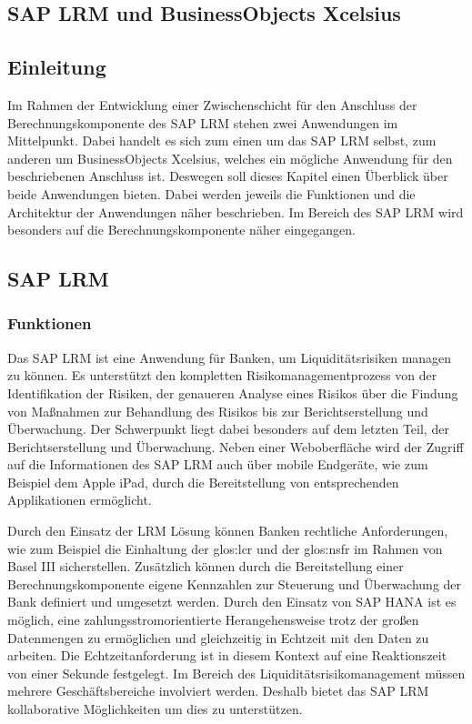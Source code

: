 \begin{onehalfspacing}
\chapter{SAP LRM und BusinessObjects Xcelsius} 

\section{Einleitung}
Im Rahmen der Entwicklung einer Zwischenschicht für den Anschluss der Berechnungskomponente des SAP LRM stehen zwei Anwendungen im Mittelpunkt. Dabei handelt es sich zum einen um das SAP LRM selbst, zum anderen um BusinessObjects Xcelsius, welches ein mögliche Anwendung für den beschriebenen Anschluss ist. Deswegen soll dieses Kapitel einen Überblick über beide Anwendungen bieten. Dabei werden jeweils die Funktionen und die Architektur der Anwendungen näher beschrieben. Im Bereich des SAP LRM wird besonders auf die Berechnungskomponente näher eingegangen.

\section{SAP LRM}

\subsection{Funktionen}
Das SAP LRM ist eine Anwendung für Banken, um Liquiditätsrisiken managen zu können. Es unterstützt den kompletten Risikomanagementprozess von der Identifikation der Risiken, der genaueren Analyse eines Risikos über die Findung von Maßnahmen zur Behandlung des Risikos bis zur Berichtserstellung und Überwachung. Der Schwerpunkt liegt dabei besonders auf dem letzten Teil, der Berichtserstellung und Überwachung. Neben einer Weboberfläche wird der Zugriff auf die Informationen des SAP LRM auch über mobile Endgeräte, wie zum Beispiel dem Apple iPad, durch die Bereitstellung von entsprechenden Applikationen ermöglicht.

Durch den Einsatz der LRM Lösung können Banken rechtliche Anforderungen, wie zum Beispiel die Einhaltung der \gls{glos:lcr} und der \gls{glos:nsfr} im Rahmen von Basel III sicherstellen. Zusätzlich können durch die Bereitstellung einer Berechnungskomponente eigene Kennzahlen zur Steuerung und Überwachung der Bank definiert und umgesetzt werden. Durch den Einsatz von SAP HANA ist es möglich, eine zahlungsstromorientierte Herangehensweise trotz der großen Datenmengen zu ermöglichen und gleichzeitig in Echtzeit mit den Daten zu arbeiten. Die Echtzeitanforderung ist in diesem Kontext auf eine Reaktionszeit von einer Sekunde festgelegt. Im Bereich des Liquiditätsrisikomanagement müssen mehrere Geschäftsbereiche involviert werden. Deshalb bietet das SAP LRM kollaborative Möglichkeiten um dies zu unterstützen.


\end{onehalfspacing}
